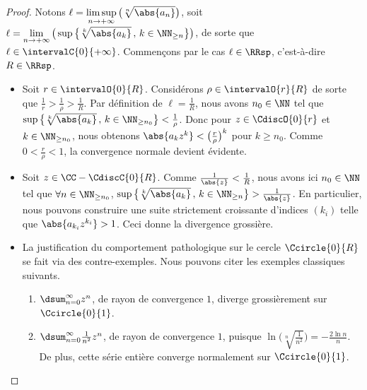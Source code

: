 \begin{proof}
    Notons 
    $\displaystyle \ell
    = \limsup_{n \to +\infty} \big( \sqrt[n]{\abs{a_n}} \big)$,
    soit
    $\displaystyle \ell
    = \lim_{n \to +\infty} \big( \sup \big\{ \sqrt[k]{\abs{a_k}} \,,\, k \in \NN_{\geq n} \big\} \big)$,
    de sorte que $\ell \in \intervalC{0}{+\infty}$.
    Commençons par le cas $\ell \in \RRsp$, c'est-à-dire $R \in \RRsp$.
    \begin{itemize}
        \item Soit $r \in \intervalO{0}{R}$.
        Considérons $\rho  \in \intervalO{r}{R}$ de sorte que $\frac1r > \frac{1}{\rho} > \frac1R$.
        Par définition de $\ell = \frac1R$,
        nous avons $n_0 \in \NN$ tel que
        $\sup \big\{ \sqrt[k]{\abs{a_k}} \,,\, k \in \NN_{\geq n_0} \big\} < \frac{1}{\rho}$.
        Donc pour $z \in \CdiscO{0}{r}$ et $k \in \NN_{\geq n_0}$, nous obtenons
        $\abs{a_k z^k} < \big( \frac{r}{\rho} \big)^k$ pour $k \geq n_0$.
        Comme $0 < \frac{r}{\rho} < 1$, la convergence normale devient évidente.


        \item Soit $z \in \CC - \CdiscC{0}{R}$.
        Comme $\frac{1}{\abs{z}} < \frac{1}{R}$, nous avons ici $n_0 \in \NN$ tel que
        $\forall n \in \NN_{\geq n_0}$,
        $\sup \big\{ \sqrt[k]{\abs{a_k}} \,,\, k \in \NN_{\geq n} \big\} > \frac{1}{\abs{z}}$.
        En particulier,
        nous pouvons construire une suite strictement croissante d'indices $(k_i)$
        telle que
        $\abs{a_{k_i} z^{k_i}} > 1$.
        Ceci donne la divergence grossière.


        \item La justification du comportement pathologique sur le cercle $\Ccircle{0}{R}$ se fait via des contre-exemples. Nous pouvons citer les exemples classiques suivants.
        \begin{enumerate}[label=(\alph*)]
	        \item $\dsum_{n=0}^{\infty} z^n$, 
	        de rayon de convergence $1$, 
	        diverge grossièrement sur $\Ccircle{0}{1}$.

	        \item $\dsum_{n=0}^{\infty} \frac{1}{n^2} z^n$, 
	        de rayon de convergence $1$,
	        puisque 
	        $ \ln \big( \sqrt[n]{\frac{1}{n^2}} \big)
	        = -\frac{2 \ln n}{n}$.
	        De plus,
	        cette série entière converge normalement sur $\Ccircle{0}{1}$.


\end{enumerate}
\end{itemize}
\end{proof}

